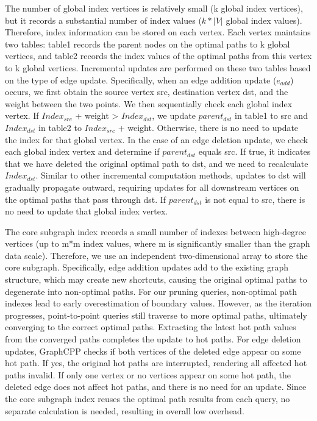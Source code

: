 \documentclass[lettersize,journal]{IEEEtran} %
\begin{document}
The number of global index vertices is relatively small (k global index vertices), but it records a substantial number of index values ($k*|V|$ global index values). Therefore, index information can be stored on each vertex. Each vertex maintains two tables: table1 records the parent nodes on the optimal paths to k global vertices, and table2 records the index values of the optimal paths from this vertex to k global vertices. Incremental updates are performed on these two tables based on the type of edge update. Specifically, when an edge addition update (${e_{add}}$) occurs, we first obtain the source vertex src, destination vertex dst, and the weight between the two points. We then sequentially check each global index vertex. If ${Index_{src}}$ + weight > ${Index_{dst}}$, we update ${parent_{dst}}$ in table1 to src and ${Index_{dst}}$ in table2 to ${Index_{src}}$ + weight. Otherwise, there is no need to update the index for that global vertex. In the case of an edge deletion update, we check each global index vertex and determine if ${parent_{dst}}$ equals src. If true, it indicates that we have deleted the original optimal path to dst, and we need to recalculate ${Index_{dst}}$. Similar to other incremental computation methods, updates to dst will gradually propagate outward, requiring updates for all downstream vertices on the optimal paths that pass through dst. If ${parent_{dst}}$ is not equal to src, there is no need to update that global index vertex.

The core subgraph index records a small number of indexes between high-degree vertices (up to m*m index values, where m is significantly smaller than the graph data scale). Therefore, we use an independent two-dimensional array to store the core subgraph. Specifically, edge addition updates add to the existing graph structure, which may create new shortcuts, causing the original optimal paths to degenerate into non-optimal paths. For our pruning queries, non-optimal path indexes lead to early overestimation of boundary values. However, as the iteration progresses, point-to-point queries still traverse to more optimal paths, ultimately converging to the correct optimal paths. Extracting the latest hot path values from the converged paths completes the update to hot paths. For edge deletion updates, GraphCPP checks if both vertices of the deleted edge appear on some hot path. If yes, the original hot paths are interrupted, rendering all affected hot paths invalid. If only one vertex or no vertices appear on some hot path, the deleted edge does not affect hot paths, and there is no need for an update. Since the core subgraph index reuses the optimal path results from each query, no separate calculation is needed, resulting in overall low overhead.
\end{document}
